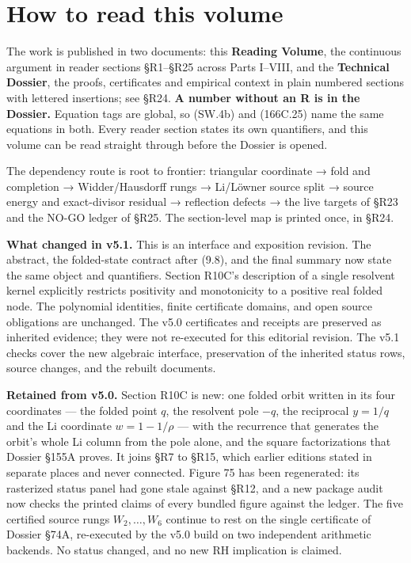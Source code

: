 \documentclass[
  11pt,
]{book}
\begin{document}
\section{How to read this volume}\label{how-to-read-this-volume}

The work is published in two documents: this \textbf{Reading Volume},
the continuous argument in reader sections §R1--§R25 across Parts
I--VIII, and the \textbf{Technical Dossier}, the proofs, certificates
and empirical context in plain numbered sections with lettered
insertions; see §R24. \textbf{A number without an R is in the Dossier.}
Equation tags are global, so (SW.4b) and (166C.25) name the same
equations in both. Every reader section states its own quantifiers, and
this volume can be read straight through before the Dossier is opened.

The dependency route is root to frontier: triangular coordinate → fold
and completion → Widder/Hausdorff rungs → Li/Löwner source split →
source energy and exact-divisor residual → reflection defects → the live
targets of §R23 and the NO-GO ledger of §R25. The section-level map is
printed once, in §R24.

\textbf{What changed in v5.1.} This is an interface and exposition
revision. The abstract, the folded-state contract after (9.8), and the
final summary now state the same object and quantifiers. Section R10C's
description of a single resolvent kernel explicitly restricts positivity
and monotonicity to a positive real folded node. The polynomial
identities, finite certificate domains, and open source obligations are
unchanged. The v5.0 certificates and receipts are preserved as inherited
evidence; they were not re-executed for this editorial revision. The
v5.1 checks cover the new algebraic interface, preservation of the
inherited status rows, source changes, and the rebuilt documents.

\textbf{Retained from v5.0.} Section R10C is new: one folded orbit
written in its four coordinates --- the folded point \(q\), the
resolvent pole \(-q\), the reciprocal \(y=1/q\) and the Li coordinate
\(w=1-1/\rho\) --- with the recurrence that generates the orbit's whole
Li column from the pole alone, and the square factorizations that
Dossier §155A proves. It joins §R7 to §R15, which earlier editions
stated in separate places and never connected. Figure 75 has been
regenerated: its rasterized status panel had gone stale against §R12,
and a new package audit now checks the printed claims of every bundled
figure against the ledger. The five certified source rungs
\(W_2,\ldots,W_6\) continue to rest on the single certificate of Dossier
§74A, re-executed by the v5.0 build on two independent arithmetic
backends. No status changed, and no new RH implication is claimed.
\end{document}

